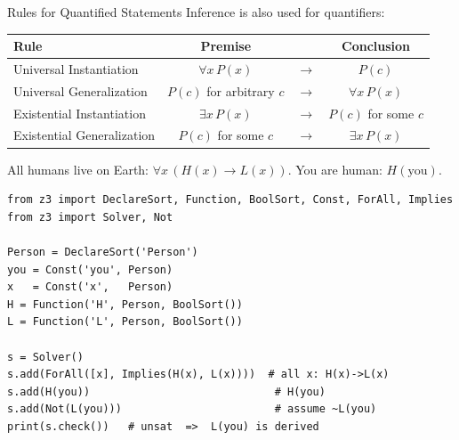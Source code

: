 \documentclass[aspectratio=169]{beamer}
\begin{document}
\begin{frame}[fragile]{Rules for Quantified Statements}
  Inference is also used for quantifiers:

  \medskip
  \begin{center}
    \renewcommand{\arraystretch}{1.35}
    \small
    \begin{tabular}{|l|c|c|c|}
      \hline
      \textbf{Rule} & \textbf{Premise} & & \textbf{Conclusion} \\
      \hline
      Universal Instantiation   & $\forall x\,P(x)$        & $\to$ & $P(c)$ \\
      Universal Generalization  & $P(c)$ for arbitrary $c$ & $\to$ & $\forall x\,P(x)$ \\
      Existential Instantiation & $\exists x\,P(x)$         & $\to$ & $P(c)$ for some $c$ \\
      Existential Generalization& $P(c)$ for some $c$      & $\to$ & $\exists x\,P(x)$ \\
      \hline
    \end{tabular}
  \end{center}

  All humans live on Earth: $\forall x\,(H(x) \to L(x))$. \quad You are human: $H(\text{you})$.

  \begin{lstlisting}[style=python]
from z3 import DeclareSort, Function, BoolSort, Const, ForAll, Implies
from z3 import Solver, Not

Person = DeclareSort('Person')
you = Const('you', Person)
x   = Const('x',   Person)
H = Function('H', Person, BoolSort())
L = Function('L', Person, BoolSort())

s = Solver()
s.add(ForAll([x], Implies(H(x), L(x))))  # all x: H(x)->L(x)
s.add(H(you))                             # H(you)
s.add(Not(L(you)))                        # assume ~L(you)
print(s.check())   # unsat  =>  L(you) is derived
  \end{lstlisting}
\end{frame}
\end{document}
